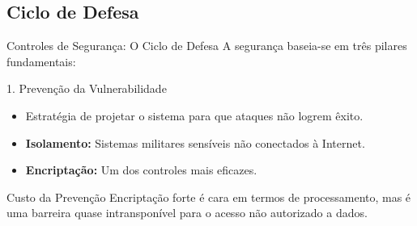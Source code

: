 \documentclass[aspectratio=169]{beamer}
\begin{document}
\subsection{Ciclo de Defesa}
\begin{frame}{Controles de Segurança: O Ciclo de Defesa}
    A segurança baseia-se em três pilares fundamentais:
    \centering
\end{frame}

\begin{frame}{1. Prevenção da Vulnerabilidade}
    \begin{itemize}
        \item Estratégia de projetar o sistema para que ataques não logrem êxito.
        \item \textbf{Isolamento:} Sistemas militares sensíveis não conectados à Internet.
        \item \textbf{Encriptação:} Um dos controles mais eficazes.
    \end{itemize}
    \begin{exampleblock}{Custo da Prevenção}
        Encriptação forte é cara em termos de processamento, mas é uma barreira quase intransponível para o acesso não autorizado a dados.
    \end{exampleblock}
\end{frame}
\end{document}
